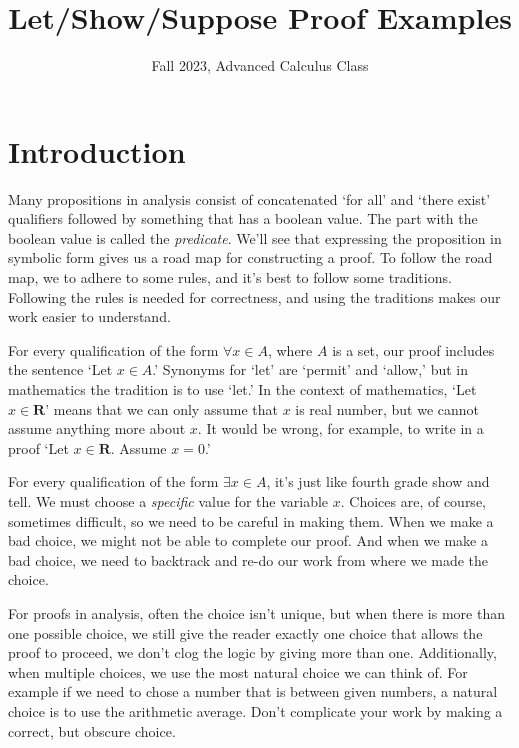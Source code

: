 \documentclass[12pt,fleqn,answers]{article}
\title{Let/Show/Suppose Proof Examples}
\author{Fall 2023, Advanced Calculus Class}
\newcommand{\reals}{\mathbf{R}}
\begin{document}
\maketitle

\section{Introduction}

Many propositions in analysis consist of concatenated `for all' and `there exist'  qualifiers followed by something that has a boolean value.  
The part with the boolean value is called the \emph{predicate}. We'll see that expressing the proposition in symbolic 
form gives us a road map for constructing  a proof. To follow the road map, we to 
adhere to some rules, and it's best to follow some traditions.  Following the rules is 
needed for correctness,  and using the  traditions makes 
 our work easier to understand.

For every qualification of the form $\forall x \in A$, where $A$ is a set, our proof includes the sentence `Let $x \in A$.'  Synonyms  for  `let' 
are `permit' and `allow,' but in mathematics the tradition is to use `let.' In the context of mathematics, `Let $x \in \reals$' means that we can only assume that $x$ is real number, but we cannot assume anything more about $x$. It would be wrong, for example, to write in a proof  
`Let $x \in \reals$. Assume $x = 0$.'

For every qualification of the form $\exists x \in A$, it's just like fourth grade show and tell. We must choose a \emph{specific} value for the 
variable $x$. Choices are, of course, sometimes difficult, so we need to be careful in making them. When we make a bad choice, we might not be able to complete our proof. And when we  make a bad choice, we need to backtrack and re-do our work from where
we made the choice.

For proofs in analysis, often the choice isn't unique, but when there is more than one possible choice,
we still give the reader exactly one choice that allows the proof to proceed, we don't clog the logic by giving more than one.
Additionally, when multiple choices, we use the most natural choice we can think of. For example if we need to chose a number that is between
given numbers, a natural choice is to use the arithmetic average. Don't complicate your work by making a correct, but obscure choice.
\end{document}
